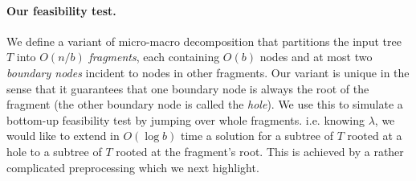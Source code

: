 \documentclass[11pt,a4paper]{article}
\theoremstyle{definition}
\theoremstyle{remark}
\begin{document}
 

%

\paragraph{Our feasibility test.}
We define a variant of micro-macro decomposition that partitions the input tree $T$ into $O(n/b)$ {\em fragments}, each containing $O(b)$ nodes and at most two {\em boundary nodes} incident to nodes in other fragments. Our variant is unique in the sense that it guarantees that one boundary node is always the root of the fragment (the other boundary node is called the {\em hole}). We use this to
 simulate a bottom-up feasibility test by jumping over whole 
fragments. i.e. knowing $\lambda$, we would like to extend in $O(\log b)$ time a solution for a subtree of $T$ rooted at a hole to a subtree of $T$ rooted at the fragment's root. This is achieved by a rather complicated preprocessing which we next highlight.
\end{document}

